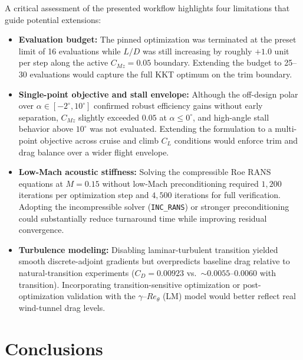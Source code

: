 \documentclass[11pt,a4paper]{article}
\begin{document}
A critical assessment of the presented workflow highlights four limitations that guide potential extensions:
\begin{itemize}
    \item \textbf{Evaluation budget:} The pinned optimization was terminated at the preset limit of 16 evaluations while $L/D$ was still increasing by roughly $+1.0$ unit per step along the active $C_{Mz} = 0.05$ boundary. Extending the budget to 25--30 evaluations would capture the full KKT optimum on the trim boundary.
    \item \textbf{Single-point objective and stall envelope:} Although the off-design polar over $\alpha \in [-2^\circ, 10^\circ]$ confirmed robust efficiency gains without early separation, $C_{Mz}$ slightly exceeded $0.05$ at $\alpha \leq 0^\circ$, and high-angle stall behavior above $10^\circ$ was not evaluated. Extending the formulation to a multi-point objective across cruise and climb $C_L$ conditions would enforce trim and drag balance over a wider flight envelope.
    \item \textbf{Low-Mach acoustic stiffness:} Solving the compressible Roe RANS equations at $M = 0.15$ without low-Mach preconditioning required $1{,}200$ iterations per optimization step and $4{,}500$ iterations for full verification. Adopting the incompressible solver (\texttt{INC\_RANS}) or stronger preconditioning could substantially reduce turnaround time while improving residual convergence.
    \item \textbf{Turbulence modeling:} Disabling laminar-turbulent transition yielded smooth discrete-adjoint gradients but overpredicts baseline drag relative to natural-transition experiments ($C_D = 0.00923$ vs.\ $\sim 0.0055$--$0.0060$ with transition). Incorporating transition-sensitive optimization or post-optimization validation with the $\gamma$--$Re_\theta$ (LM) model would better reflect real wind-tunnel drag levels.
\end{itemize}

\section{Conclusions}
\end{document}
